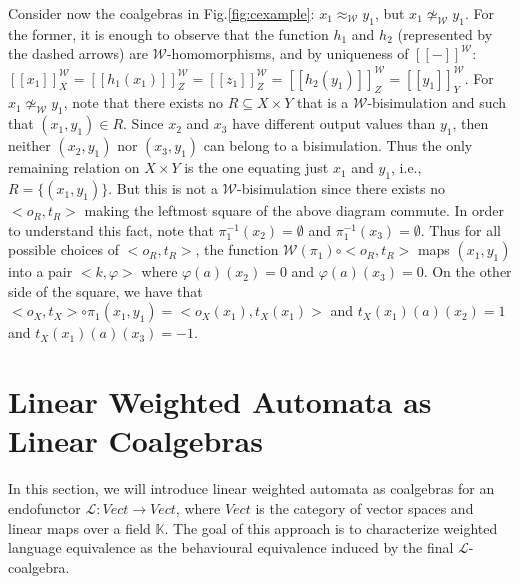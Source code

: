 \documentclass[3p]{elsarticle}
\newcommand{\fW}{\mathcal{W}}    %
\newcommand{\fL}{\mathcal{L}}    %
\newcommand{\setproduct}{\times} %
\newcommand{\beh}[3]{\left[\!\left[ #1 \right]\!\right]^{#2}_{#3}} %
\newcommand{\K}{\mathbb{K}}            %
\begin{document}
Consider now the coalgebras in Fig.\ref{fig:cexample}: $x_1
\approx_\fW y_1$, but $x_1 \not \simeq_\fW y_1$. For the former, it
is enough to observe that the function $h_1$ and $h_2$ (represented
by the dashed arrows) are $\fW$-homomorphisms, and by uniqueness of
$\beh{-}{\fW}{}$:
$\beh{x_1}{\fW}{X}=\beh{h_1(x_1)}{\fW}{Z}=\beh{z_1}{\fW}{Z}=\beh{h_2(y_1)}{\fW}{Z}=\beh{y_1}{\fW}{Y}$.
For $x_1 \not \simeq_\fW y_1$, note that there exists no $R\subseteq
X \setproduct Y$ that is a $\fW$-bisimulation and such that
$(x_1,y_1)\in R$. Since $x_2$ and $x_3$ have different output values than
$y_1$, then neither $(x_2,y_1)$
nor $(x_3,y_1)$ can belong to a bisimulation. Thus the only
remaining relation on $X\times Y$ is the one equating just $x_1$ and
$y_1$, i.e., $R=\{(x_1,y_1)\}$. But this is not a $\fW$-bisimulation
since there exists no $<o_R,t_R>$ making the leftmost square of the
above diagram commute. In order to understand this fact, note that
$\pi_1^{-1}(x_2)=\emptyset$ and $\pi_1^{-1}(x_3)=\emptyset$. Thus
for all possible choices of $<o_R,t_R>$, the function
$\fW(\pi_1)\circ <o_R, t_R>$ maps $(x_1,y_1)$ into a pair
$<k,\varphi>$ where $\varphi(a)(x_2)=0$ and $\varphi(a)(x_3)=0$. On
the other side of the square, we have that $<o_X,t_X> \circ
\pi_1(x_1,y_1)= <o_X(x_1),t_X(x_1)>$ and $t_X (x_1)(a)(x_2)=1$ and
$t_X (x_1)(a)(x_3)=-1$.

%






\section{Linear Weighted Automata as Linear Coalgebras}\label{sec:linearcoalg}

In this section, we will introduce linear weighted automata as
coalgebras for an endofunctor $\fL\colon Vect\to Vect$, where $Vect$
is the category of vector spaces and linear maps over a field $\K$.
The goal of this approach is to characterize weighted language
equivalence as the behavioural equivalence induced by the final
$\fL$-coalgebra.
\end{document}
